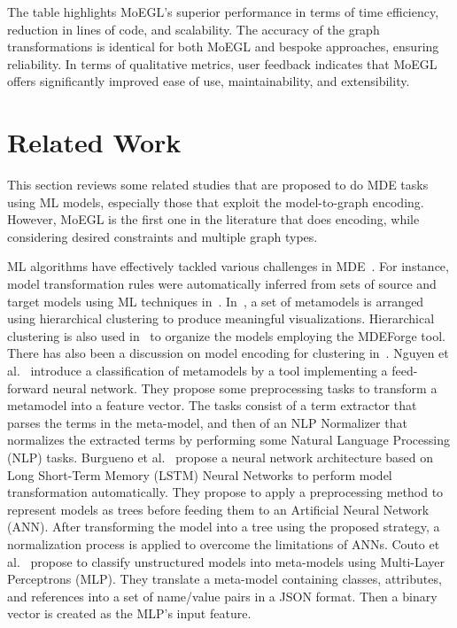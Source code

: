 \documentclass[journal,article,submit,moreauthors,technologies]{Definitions/mdpi}
\begin{document}
\noindent
The table highlights MoEGL's superior performance in terms of time efficiency, reduction in lines of code, and scalability. The accuracy of the graph transformations is identical for both MoEGL and bespoke approaches, ensuring reliability. In terms of qualitative metrics, user feedback indicates that MoEGL offers significantly improved ease of use, maintainability, and extensibility.


\section{Related Work} \label{Sec:relatedwork}
This section reviews some related studies that are proposed to do MDE tasks using ML models, especially those that exploit the model-to-graph encoding. However, MoEGL is the first one in the literature that does encoding, while considering desired constraints and multiple graph types.


ML algorithms have effectively tackled various challenges in MDE~\cite{babur2018ammore}. For instance, model transformation rules were automatically inferred from sets of source and target models using ML techniques in~\cite{burgueno2019lstm, dolques2010learning}. In~\cite{babur2016hierarchical}, a set of metamodels is arranged using hierarchical clustering to produce meaningful visualizations. Hierarchical clustering is also used in~\cite{basciani2016automated} to organize the models employing the MDEForge tool. There has also been a discussion on model encoding for clustering in~\cite{babur2017using}.
Nguyen et al.~\cite{nguyen2019automated} introduce a classification of metamodels by a tool implementing a feed-forward neural network. They propose some preprocessing tasks to transform a metamodel into a feature vector. The tasks consist of a term extractor that parses the terms in the meta-model, and then of an NLP Normalizer that normalizes the extracted terms by performing some Natural Language Processing (NLP) tasks. Burgueno et al.~\cite{burgueno2019lstm} propose a neural network architecture based on Long Short-Term Memory (LSTM) Neural Networks to perform model transformation automatically. They propose to apply a preprocessing method to represent models as trees before feeding them to an Artificial Neural Network (ANN). After transforming the model into a tree using the proposed strategy, a normalization process is applied to overcome the limitations of ANNs. Couto et al.~\cite{couto2020classifying} propose to classify unstructured models into meta-models using Multi-Layer Perceptrons (MLP). They translate a meta-model containing classes, attributes, and references into a set of name/value pairs in a JSON format. Then a binary vector is created as the MLP's input feature.
\end{document}
